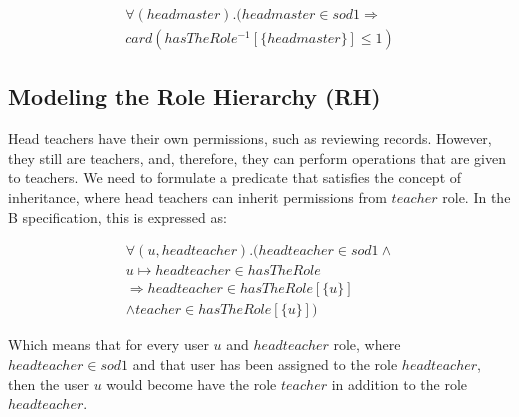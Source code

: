 \begin{align*}
\forall (headmaster). (headmaster \in sod1  \Rightarrow \\
                            card(hasTheRole^{-1} [\{headmaster\}]  \leq 1 )  
\end{align*}


\subsection{Modeling the Role Hierarchy (RH)}
     Head teachers have their own permissions, such as reviewing records.  However, they still are teachers, and, therefore, they can perform operations that are given to teachers.  We need to formulate a predicate that satisfies the concept of inheritance, where head teachers can inherit permissions from $teacher$ role.  In the B specification, this is expressed as:

\begin{align*}
\forall (u, headteacher) . (headteacher  \in sod1  \wedge  \\ u \mapsto headteacher \in hasTheRole
\\ \Rightarrow headteacher  \in hasTheRole[\{u\}]  \\ \wedge  teacher  \in hasTheRole[\{u\}] )
\end{align*}

    Which means that for every user $u$ and $headteacher$ role, where $ headteacher \in sod1$  and that user has been assigned to the role $headteacher$, then the user $u$ would become have the role $teacher$ in addition to the role $headteacher$. \\

